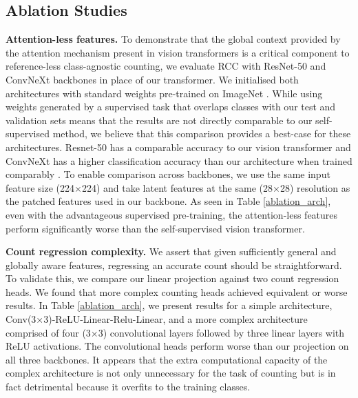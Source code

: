 \documentclass[letterpaper, 11pt]{IEEEtran}
\begin{document}
\vspace{5mm}
\subsection{Ablation Studies}
\label{results_ablationstudies}

\textbf{Attention-less features.}
To demonstrate that the global context provided by the attention mechanism present in vision transformers is a critical component to reference-less class-agnostic counting, we evaluate RCC with ResNet-50 \cite{he2016resnet} and ConvNeXt \cite{liu2022convnext} backbones in place of our transformer. 
We initialised both architectures with standard weights pre-trained on ImageNet \cite{deng2009imagenet}. 
While using weights generated by a supervised task that overlaps classes with our test and validation sets means that the results are not directly comparable to our self-supervised method, we believe that this comparison provides a best-case for these architectures.
Resnet-50 has a comparable accuracy to our vision transformer and ConvNeXt has a higher classification accuracy than our architecture when trained comparably \cite{liu2022convnext}.
To enable comparison across backbones, we use the same input feature size (224$\times$224) and take latent features at the same (28$\times$28) resolution as the patched features used in our backbone. 
As seen in Table \ref{ablation_arch}, even with the advantageous supervised pre-training, the attention-less features perform significantly worse than the self-supervised vision transformer.

\vspace{5mm}

\textbf{Count regression complexity.}
We assert that given sufficiently general and globally aware features, regressing an accurate count should be straightforward. To validate this, we compare our linear projection against two count regression heads. We found that more complex counting heads achieved equivalent or worse results. In Table \ref{ablation_arch}, we present results for a simple architecture, Conv(3$\times$3)-ReLU-Linear-Relu-Linear, and a more complex architecture comprised of four (3$\times$3) convolutional layers followed by three linear layers with ReLU activations. The convolutional heads perform worse than our projection on all three backbones. It appears that the extra computational capacity of the complex architecture is not only unnecessary for the task of counting but is in fact detrimental because it overfits to the training classes.
\begin{table}
    \centering
    \fontsize{9}{9}\selectfont
    
    \caption{\textbf{Performance of different feature backbones, and two more complex count regression head architectures on FSC-133.}
    }
    \label{ablation_arch}
\end{table}
\end{document}
